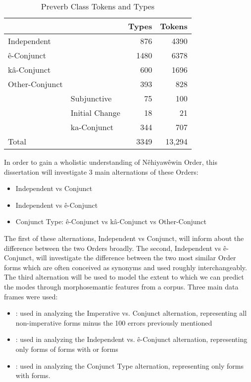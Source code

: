 \begin{table}
\centering
\begin{tabular}{llrr} \\
\toprule
            &   & Types & Tokens \\
\midrule
Independent    &                      &  876  & 4390   \\
ê-Conjunct     &                      & 1480  & 6378   \\
kâ-Conjunct    &                      &  600  & 1696   \\
Other-Conjunct &                      &  393    & 828   \\
               & Subjunctive          &  75   & 100      \\
               & Initial Change       &  18   & 21      \\
               & ka-Conjunct          &  344 & 707      \\
               
\midrule
Total & &  3349  & 13,294   \\
\bottomrule
\end{tabular}
\caption{Preverb Class Tokens and Types \label{tab:corporder}
}
\end{table}

In order to gain a wholistic understanding of Nêhiyawêwin Order, this dissertation will investigate 3 main alternations of these Orders:

\begin{itemize}
    \item Independent vs Conjunct
    \item Independent vs ê-Conjunct
    \item Conjunct Type: ê-Conjunct vs kâ-Conjunct vs Other-Conjunct
\end{itemize}

The first of these alternations, Independent vs Conjunct, will inform about the difference between the two Orders broadly. The second, Independent vs ê-Conjunct, will investigate the difference between the two most similar Order forms which are often conceived as synonyms and used roughly interchangeably. The third alternation will be used to model the extent to which we can predict the modes through morphosemantic features from a corpus. Three main data frames were used:

\begin{itemize}
    \item {}: used in analyzing the Imperative vs. Conjunct alternation, representing all non-imperative forms minus the 100 errors previously mentioned
    \item {}: used in analyzing the Independent vs. ê-Conjunct alternation, representing only forms of forms with   or  forms
    \item {}: used in analyzing the Conjunct Type alternation, representing only forms with   forms. 
\end{itemize}

